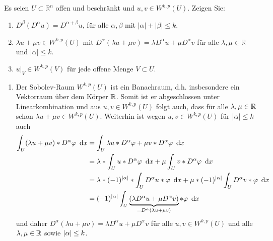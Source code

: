 \begin{exercisePage}
	\begin{task}
		Es seien $U \subset \mathbb R^n$ offen und beschränkt und $u,v \in W^{k,p}(U)$. Zeigen Sie:
		\begin{enumerate}
			\item $D^\beta(D^\alpha u) = D^{\alpha + \beta} u$, für alle $\alpha, \beta$ mit $|\alpha| + |\beta| \leq k$. 
			\item $\lambda u + \mu v \in W^{k,p}(U)$ mit $D^\alpha(\lambda u + \mu v) = \lambda D^\alpha u + \mu D^\alpha v$ für alle $\lambda, \mu \in \mathbb{R}$ und $|\alpha|\leq k$.
			\item $u|_V \in W^{k,p}(V)$ für jede offene Menge $V\subset U$.
		\end{enumerate}	
	\end{task}
	\begin{enumerate}[label=(zu \alph*), leftmargin=*, start=2]
		\item Der Sobolev-Raum $W^{k,p}(U)$ ist ein Banachraum, d.h. insbesondere ein Vektorraum über dem Körper $\mathbb{R}$. Somit ist er abgeschlossen unter Linearkombination und aus $u,v \in W^{k,p}(U)$ folgt auch, dass für alle $\lambda, \mu \in \mathbb{R}$ schon $\lambda u + \mu v \in W^{k,p}(U)$. Weiterhin ist wegen $u,v \in W^{k,p}(U)$ für $\left| \alpha \right| \le k$ auch
		\begin{equation*}
			\begin{aligned}
				\int_U (\lambda u + \mu v) * D^\alpha \varphi \enskip \mathrm{d}x 
				&= \int_U \lambda u * D^\alpha \varphi + \mu v * D^\alpha \varphi \enskip \mathrm{d}x \\
				&= \lambda * \int_U u * D^\alpha \varphi \enskip \mathrm{d}x + \mu \int_U v * D^\alpha \varphi \enskip \mathrm{d}x \\
				&= \lambda * (-1)^{\left| \alpha \right|} * \int_U D^\alpha u * \varphi \enskip \mathrm{d}x + \mu * (-1)^{\left| \alpha \right|} \int_U D^\alpha v * \varphi \enskip \mathrm{d}x \\
				&= (-1)^{\left| \alpha \right|} \int_U \underbrace{\left( \lambda D^\alpha u + \mu D^\alpha v \right)}_{= D^\alpha(\lambda u + \mu v)} * \varphi \enskip \mathrm{d}x
			\end{aligned}
		\end{equation*}
		und daher $D^\alpha (\lambda u + \mu v) = \lambda D^\alpha u + \mu D^\alpha v$ für alle $u,v \in W^{k,p}(U)$ und alle $\lambda, \mu \in \mathbb{R}$ sowie $\left| \alpha \right| \le k$.
	\end{enumerate}
\end{exercisePage}